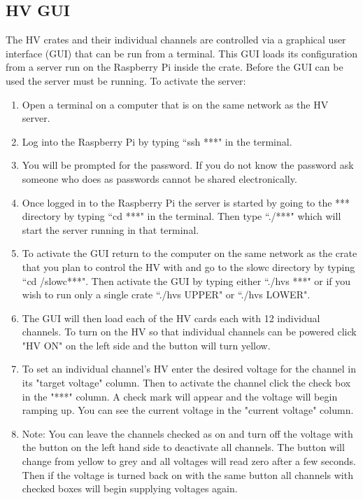 \documentclass[oneside]{book}   %
\begin{document}
\subsection{HV GUI}
\label{ssec:gui}

The HV crates and their individual channels are controlled via a graphical user interface (GUI) that can be run from a terminal. This GUI loads its configuration from a server run on the Raspberry Pi inside the crate. Before the GUI can be used the server must be running. To activate the server:

\begin{enumerate}
	\item Open a terminal on a computer that is on the same network as the HV server.
	\item Log into the Raspberry Pi by typing ``ssh ***" in the terminal.
	\item You will be prompted for the password. If you do not know the password ask someone who does as passwords cannot be shared electronically. 
	\item Once logged in to the Raspberry Pi the server is started by going to the *** directory by typing ``cd ***" in the terminal. Then type ``./***" which will start the server running in that terminal.
	\item To activate the GUI return to the computer on the same network as the crate that you plan to control the HV with and go to the slowc directory by typing ``cd /slowc***". Then activate the GUI by typing either ``./hvs ***" or if you wish to run only a single crate ``./hvs UPPER" or ``./hvs LOWER".
	\item The GUI will then load each of the HV cards each with 12 individual channels. To turn on the HV so that individual channels can be powered click "HV ON" on the left side and the button will turn yellow.
	\item To set an individual channel's HV enter the desired voltage for the channel in its "target voltage" column. Then to activate the channel click the check box in the "***" column. A check mark will appear and the voltage will begin ramping up. You can see the current voltage in the "current voltage" column.
	\item Note: You can leave the channels checked as on and turn off the voltage with the button on the left hand side to deactivate all channels. The button will change from yellow to grey and all voltages will read zero after a few seconds. Then if the voltage is turned back on with the same button all channels with checked boxes will begin supplying voltages again. 
\end{enumerate}
\end{document}
